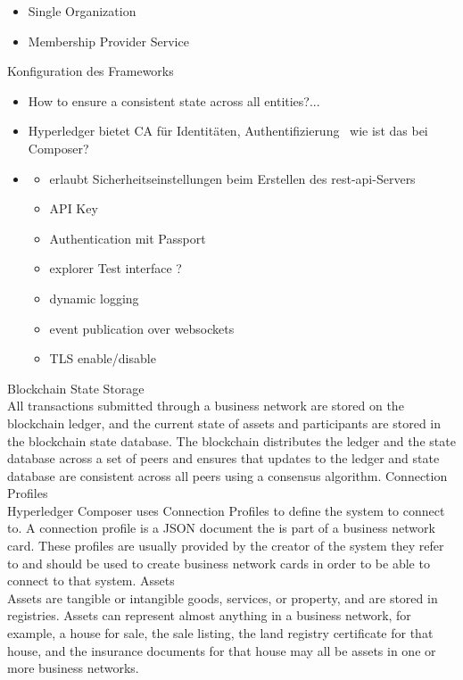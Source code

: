         \begin{itemize}[noitemsep]
            \item Single Organization 
            \item Membership Provider Service
        \end{itemize}
        
        Konfiguration des Frameworks
        \begin{itemize}[noitemsep]
            \item How to ensure a consistent state across all entities?...
            \item Hyperledger bietet CA für Identitäten, Authentifizierung \textrightarrow\ wie ist das bei Composer?
            \item \begin{itemize}
                \item erlaubt Sicherheitseinstellungen beim Erstellen des \gls{rest}-\gls{api}-Servers
                \item API Key
                \item Authentication mit Passport
                \item explorer Test interface ?
                \item dynamic logging
                \item event publication over websockets
                \item TLS enable/\-disable
            \end{itemize}
        \end{itemize}
    
Blockchain State Storage\\
All transactions submitted through a business network are stored on the blockchain ledger, and the current state of assets and participants are stored in the blockchain state database. The blockchain distributes the ledger and the state database across a set of peers and ensures that updates to the ledger and state database are consistent across all peers using a consensus algorithm.
\medskip
Connection Profiles\\
Hyperledger Composer uses Connection Profiles to define the system to connect to. A connection profile is a JSON document the is part of a business network card. These profiles are usually provided by the creator of the system they refer to and should be used to create business network cards in order to be able to connect to that system.
\medskip
Assets\\
Assets are tangible or intangible goods, services, or property, and are stored in registries. Assets can represent almost anything in a business network, for example, a house for sale, the sale listing, the land registry certificate for that house, and the insurance documents for that house may all be assets in one or more business networks.


